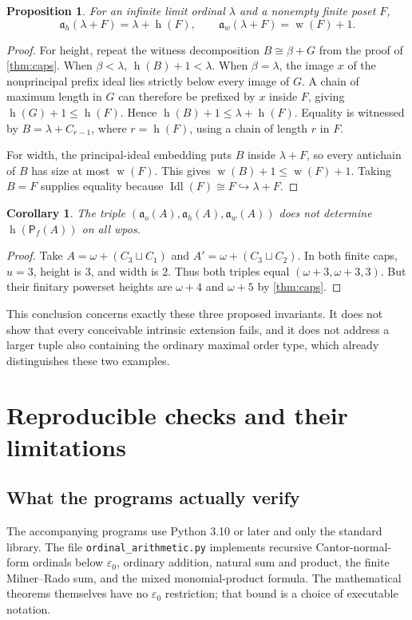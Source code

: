 \documentclass[11pt,letterpaper]{article}
\theoremstyle{teal}
\newtheorem{proposition}[theorem]{Proposition}
\newtheorem{corollary}[theorem]{Corollary}
\theoremstyle{definition}
\newcommand{\Pf}{\mathsf P_{\!f}}
\newcommand{\Idl}{\operatorname{Idl}}
\newcommand{\hgt}{\operatorname{h}}
\newcommand{\wid}{\operatorname{w}}
\newcommand{\ao}{\mathfrak a_o}
\newcommand{\ah}{\mathfrak a_h}
\newcommand{\aw}{\mathfrak a_w}
\newcommand{\emb}{\hookrightarrow}
\newcommand{\eps}{\varepsilon}
\begin{document}
\begin{proposition}\label{prop:othercaps}
For an infinite limit ordinal $\lambda$ and a nonempty finite poset $F$,
\[
 \ah(\lambda+F)=\lambda+\hgt(F),\qquad
 \aw(\lambda+F)=\wid(F)+1.
\]
\end{proposition}
\begin{proof}
For height, repeat the witness decomposition $B\cong\beta+G$ from the proof of \cref{thm:caps}. When $\beta<\lambda$, $\hgt(B)+1<\lambda$. When $\beta=\lambda$, the image $x$ of the nonprincipal prefix ideal lies strictly below every image of $G$. A chain of maximum length in $G$ can therefore be prefixed by $x$ inside $F$, giving $\hgt(G)+1\leq\hgt(F)$. Hence $\hgt(B)+1\leq\lambda+\hgt(F)$. Equality is witnessed by $B=\lambda+C_{r-1}$, where $r=\hgt(F)$, using a chain of length $r$ in $F$.

For width, the principal-ideal embedding puts $B$ inside $\lambda+F$, so every antichain of $B$ has size at most $\wid(F)$. This gives $\wid(B)+1\leq\wid(F)+1$. Taking $B=F$ supplies equality because $\Idl(F)\cong F\emb\lambda+F$.
\end{proof}

\begin{corollary}\label{cor:triple-fail}
The triple $(\ao(A),\ah(A),\aw(A))$ does not determine $\hgt(\Pf(A))$ on all wpos.
\end{corollary}
\begin{proof}
Take $A=\omega+(C_3\sqcup C_1)$ and $A'=\omega+(C_3\sqcup C_2)$. In both finite caps, $u=3$, height is $3$, and width is $2$. Thus both triples equal $(\omega+3,\omega+3,3)$. But their finitary powerset heights are $\omega+4$ and $\omega+5$ by \cref{thm:caps}.
\end{proof}

This conclusion concerns exactly these three proposed invariants. It does not show that every conceivable intrinsic extension fails, and it does not address a larger tuple also containing the ordinary maximal order type, which already distinguishes these two examples.

\section{Reproducible checks and their limitations}
\subsection{What the programs actually verify}
The accompanying programs use Python 3.10 or later and only the standard library. The file \texttt{ordinal\_arithmetic.py} implements recursive Cantor-normal-form ordinals below $\eps_0$, ordinary addition, natural sum and product, the finite Milner--Rado sum, and the mixed monomial-product formula. The mathematical theorems themselves have no $\eps_0$ restriction; that bound is a choice of executable notation.
\end{document}
